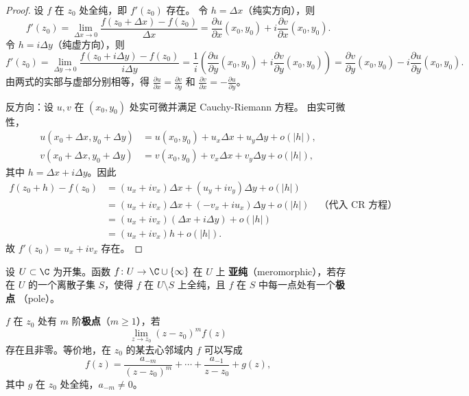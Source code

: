 \begin{proof}
设 $f$ 在 $z_0$ 处全纯，即 $f'(z_0)$ 存在。
令 $h = \Delta x$（纯实方向），则
\[
  f'(z_0) = \lim_{\Delta x \to 0}
  \frac{f(z_0 + \Delta x) - f(z_0)}{\Delta x}
  = \frac{\partial u}{\partial x}(x_0, y_0)
  + i\frac{\partial v}{\partial x}(x_0, y_0).
\]
令 $h = i\Delta y$（纯虚方向），则
\[
  f'(z_0) = \lim_{\Delta y \to 0}
  \frac{f(z_0 + i\Delta y) - f(z_0)}{i\Delta y}
  = \frac{1}{i}\left(
    \frac{\partial u}{\partial y}(x_0, y_0)
    + i\frac{\partial v}{\partial y}(x_0, y_0)
  \right)
  = \frac{\partial v}{\partial y}(x_0, y_0)
  - i\frac{\partial u}{\partial y}(x_0, y_0).
\]
由两式的实部与虚部分别相等，得
$\frac{\partial u}{\partial x} = \frac{\partial v}{\partial y}$ 和
$\frac{\partial v}{\partial x} = -\frac{\partial u}{\partial y}$。

反方向：设 $u, v$ 在 $(x_0, y_0)$ 处实可微并满足 Cauchy-Riemann 方程。
由实可微性，
\begin{align}
  u(x_0 + \Delta x, y_0 + \Delta y) &= u(x_0, y_0)
    + u_x \Delta x + u_y \Delta y + o(|h|), \\
  v(x_0 + \Delta x, y_0 + \Delta y) &= v(x_0, y_0)
    + v_x \Delta x + v_y \Delta y + o(|h|),
\end{align}
其中 $h = \Delta x + i\Delta y$。因此
\begin{align}
  f(z_0 + h) - f(z_0)
  &= (u_x + iv_x)\Delta x + (u_y + iv_y)\Delta y + o(|h|) \\
  &= (u_x + iv_x)\Delta x + (-v_x + iu_x)\Delta y + o(|h|)
    \quad\text{（代入 CR 方程）} \\
  &= (u_x + iv_x)(\Delta x + i\Delta y) + o(|h|) \\
  &= (u_x + iv_x) h + o(|h|).
\end{align}
故 $f'(z_0) = u_x + iv_x$ 存在。
\end{proof}

\begin{definition}[亚纯函数]
\label{def:meromorphic}
设 $U \subset \C$ 为开集。函数 $f\colon U \to \C \cup \{\infty\}$ 在 $U$ 上
\textbf{亚纯}（meromorphic），若存在 $U$ 的一个离散子集 $S$，使得
$f$ 在 $U \setminus S$ 上全纯，且 $f$ 在 $S$ 中每一点处有一个\textbf{极点}
（pole）。
\end{definition}

\begin{definition}[极点]
\label{def:pole}
$f$ 在 $z_0$ 处有 $m$ 阶\textbf{极点}（$m \geq 1$），若
\[
  \lim_{z \to z_0} (z - z_0)^m f(z)
\]
存在且非零。等价地，在 $z_0$ 的某去心邻域内 $f$ 可以写成
\[
  f(z) = \frac{a_{-m}}{(z - z_0)^m} + \cdots + \frac{a_{-1}}{z - z_0}
  + g(z),
\]
其中 $g$ 在 $z_0$ 处全纯，$a_{-m} \neq 0$。
\end{definition}

